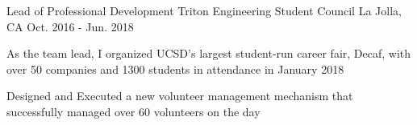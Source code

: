 

\begin{cventries}

  \cventry
    {Lead of Professional Development} %
    {Triton Engineering Student Council} %
    {La Jolla, CA} %
    {Oct. 2016 - Jun. 2018} %
    {
      \begin{cvitems} %
        \item {As the team lead, I organized UCSD's largest student-run career fair, Decaf, with over 50 companies and 1300 students in attendance in January 2018}
% 
% 
% 
% 
        \item {Designed and Executed a new volunteer management mechanism that successfully managed over 60 volunteers on the day}
% 
% 
      \end{cvitems}
    }


\end{cventries}
